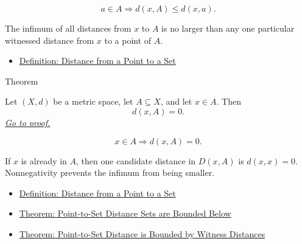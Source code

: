 \begin{remark*}
\[
a\in A
\Longrightarrow
d(x,A)\leq d(x,a).
\]
\end{remark*}

\begin{remark*}[Interpretation]
The infimum of all distances from \(x\) to \(A\) is no larger than any one
particular witnessed distance from \(x\) to a point of \(A\).
\end{remark*}


\begin{dependencies}
\begin{itemize}
  \item \hyperref[def:metric-point-set-distance]{Definition: Distance from a Point to a Set}
\end{itemize}
\end{dependencies}

\begin{theorembox}{Theorem}
\begin{theorem}
\label{thm:metric-distance-to-set-zero-of-mem}
Let \((X,d)\) be a metric space, let \(A\subseteq X\), and let \(x\in A\).
Then
\[
  d(x,A)=0.
\]
\hyperref[prf:metric-distance-to-set-zero-of-mem]{\textit{Go to proof.}}
\end{theorem}
\end{theorembox}

\begin{remark*}
\[
x\in A
\Longrightarrow
d(x,A)=0.
\]
\end{remark*}

\begin{remark*}[Interpretation]
If \(x\) is already in \(A\), then one candidate distance in \(D(x,A)\) is
\(d(x,x)=0\).  Nonnegativity prevents the infimum from being smaller.
\end{remark*}


\begin{dependencies}
\begin{itemize}
  \item \hyperref[def:metric-point-set-distance]{Definition: Distance from a Point to a Set}
  \item \hyperref[thm:metric-distance-set-bounded-below]{Theorem: Point-to-Set Distance Sets are Bounded Below}
  \item \hyperref[thm:metric-distance-to-set-le-distance-to-point-of-mem]{Theorem: Point-to-Set Distance is Bounded by Witness Distances}
\end{itemize}
\end{dependencies}

